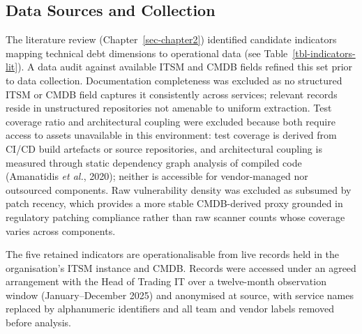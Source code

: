 \documentclass[
  12pt,
  letterpaper,
  12pt,
  oneside,
  english,
  onehalfspacing,
  headsepline]{MastersDoctoralThesis}
\begin{document}
\subsection{Data Sources and Collection}\label{sec-datasources}

The literature review (Chapter~\ref{sec-chapter2}) identified candidate
indicators mapping technical debt dimensions to operational data (see
Table~\ref{tbl-indicators-lit}). A data audit against available ITSM and
CMDB fields refined this set prior to data collection. Documentation
completeness was excluded as no structured ITSM or CMDB field captures
it consistently across services; relevant records reside in unstructured
repositories not amenable to uniform extraction. Test coverage ratio and
architectural coupling were excluded because both require access to
assets unavailable in this environment: test coverage is derived from
CI/CD build artefacts or source repositories, and architectural coupling
is measured through static dependency graph analysis of compiled code
(Amanatidis \emph{et al.}, 2020); neither is accessible for
vendor-managed nor outsourced components. Raw vulnerability density was
excluded as subsumed by patch recency, which provides a more stable
CMDB-derived proxy grounded in regulatory patching compliance rather
than raw scanner counts whose coverage varies across components.

The five retained indicators are operationalisable from live records
held in the organisation's ITSM instance and CMDB. Records were accessed
under an agreed arrangement with the Head of Trading IT over a
twelve-month observation window (January--December 2025) and anonymised
at source, with service names replaced by alphanumeric identifiers and
all team and vendor labels removed before analysis.
\end{document}

